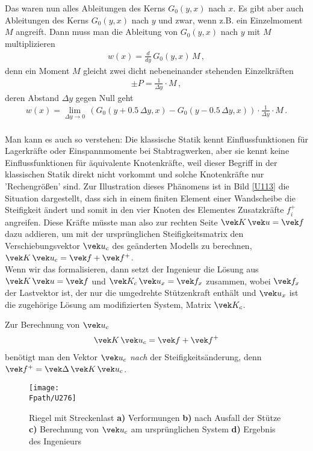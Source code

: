 {{{{Das waren nun alles Ableitungen des Kerns $G_0(y,x)$ nach $x$. Es gibt aber auch Ableitungen des Kerns $G_0(y,x)$ nach $y$ und zwar, wenn
z.B. ein Einzelmoment $M$ angreift. Dann muss man die Ableitung von $G_0(y,x)$ nach $y$ mit $M$ multiplizieren
\begin{align}
w(x) = \frac{d}{dy}\,G_0(y,x)\,M\,,
\end{align}
denn ein Moment $M$ gleicht zwei dicht nebeneinander stehenden Einzelkr\"{a}ften
\begin{align}
\pm P = \frac{1}{\Delta y} \cdot M\,,
\end{align}
deren Abstand $\Delta y$ gegen Null geht
\begin{align}
w(x) = \lim_{\Delta y \to 0}\, (G_0(y + 0.5\,\Delta y,x)  -  G_0(y - 0.5\,\Delta y,x)) \cdot \frac{1}{\Delta y} \cdot M\,.
\end{align}\\

Man kann es auch so verstehen: Die klassische Statik kennt Einflussfunktionen f\"{u}r Lagerkr\"{a}fte oder Einspannmomente bei Stabtragwerken, aber sie kennt keine Einflussfunktionen f\"{u}r \"{a}quivalente Knotenkr\"{a}fte, weil dieser Begriff in der klassischen Statik direkt nicht vorkommt und solche Knotenkr\"{a}fte nur 'Rechengr\"{o}{\ss}en' sind.
Zur Illustration dieses Ph\"{a}nomens ist in Bild \ref{U113} die Situation dargestellt, dass sich in einem finiten Element einer Wandscheibe die Steifigkeit \"{a}ndert und somit in den vier Knoten des Elementes Zusatzkr\"{a}fte $f_i^+$ angreifen. Diese Kr\"{a}fte m\"{u}sste man also zur rechten Seite $\vek K\,\vek u = \vek f$ dazu addieren, um mit der urspr\"{u}nglichen Steifigkeitsmatrix den Verschiebungsvektor $\vek u_c$ des ge\"{a}nderten Modells zu berechnen, $\vek K\,\vek u_c = \vek f + \vek f^+$.
\\

Wenn wir das formalisieren, dann setzt der Ingenieur die L\"{o}sung aus $\vek K\,\vek u = \vek f$ und $\vek K_c\,\vek u_x = \vek f_x$ zusammen, wobei $\vek f_x$ der Lastvektor ist, der nur die umgedrehte St\"{u}tzenkraft enth\"{a}lt und $\vek u_x$ ist die zugeh\"{o}rige L\"{o}sung am modifizierten System, Matrix $\vek K_c$.

Zur Berechnung von $\vek u_c$
\begin{align}
\vek K\,\vek u_c = \vek f + \vek f^+
\end{align}
ben\"{o}tigt man den Vektor $\vek u_c$ {\em nach\/} der Steifigkeits\"{a}nderung, denn $\vek f^+ = \vek \Delta \,\vek K\,\vek u_c$.
\begin{figure}[tbp]
\centering
\texttt{[image: \\Fpath/U276]}
\caption{Riegel mit Streckenlast \textbf{ a)} Verformungen  \textbf{ b)} nach Ausfall der St\"{u}tze \textbf{ c)} Berechnung von $\vek u_c$ am urspr\"{u}nglichen System \textbf{ d)} Ergebnis des Ingenieurs}
\label{U276}
%
\end{figure}%

}}}}
